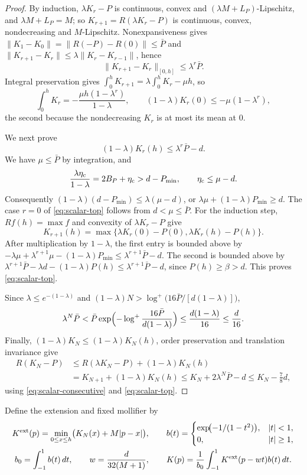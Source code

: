 \begin{proof}
By induction, $\lambda K_r-P$ is continuous, convex and $(\lambda M+L_P)$-Lipschitz, and $\lambda M+L_P=M$; so
$K_{r+1}=R(\lambda K_r-P)$ is continuous, convex, nondecreasing and $M$-Lipschitz. Nonexpansiveness gives
$\|K_1-K_0\|=\|R(-P)-R(0)\|\le\bar P$ and $\|K_{r+1}-K_r\|\le\lambda\|K_r-K_{r-1}\|$, hence
\begin{equation}\label{eq:scalar-consecutive}
 \|K_{r+1}-K_r\|_{[0,h]}\le\lambda^r\bar P.
\end{equation}
Integral preservation gives $\int_0^hK_{r+1}=\lambda\int_0^hK_r-\mu h$, so
\[
 \int_0^hK_r=-\frac{\mu h(1-\lambda^r)}{1-\lambda},\qquad
 (1-\lambda)K_r(0)\le-\mu(1-\lambda^r),
\]
the second because the nondecreasing $K_r$ is at most its mean at $0$.

We next prove
\begin{equation}\label{eq:scalar-top}
 (1-\lambda)K_r(h)\le\lambda^r\bar P-d.
\end{equation}
We have $\mu\le\bar P$ by integration, and
\[
 \frac{\lambda\eta_{\rm c}}{1-\lambda}=2B_P+\eta_{\rm c}>d-P_{\min},\qquad
 \eta_{\rm c}\le\mu-d.
\]
Consequently
$(1-\lambda)(d-P_{\min})\le\lambda(\mu-d)$, or
$\lambda\mu+(1-\lambda)P_{\min}\ge d$.
The case $r=0$ of \eqref{eq:scalar-top} follows from $d<\mu\le\bar P$.
For the induction step, $Rf(h)=\max f$ and convexity of $\lambda K_r-P$ give
\[
 K_{r+1}(h)=\max\{\lambda K_r(0)-P(0),\lambda K_r(h)-P(h)\}.
\]
After multiplication by $1-\lambda$, the first entry is bounded above by
$-\lambda\mu+\lambda^{r+1}\mu-(1-\lambda)P_{\min}\le\lambda^{r+1}\bar P-d$.
The second is bounded above by
$\lambda^{r+1}\bar P-\lambda d-(1-\lambda)P(h)\le\lambda^{r+1}\bar P-d$, since $P(h)\ge\beta>d$.
This proves \eqref{eq:scalar-top}.

Since $\lambda\le e^{-(1-\lambda)}$ and $(1-\lambda)N>\log^+\bigl(16\bar P/[d(1-\lambda)]\bigr)$,
\[
 \lambda^N\bar P<\bar P\exp\Bigl(-\log^+\frac{16\bar P}{d(1-\lambda)}\Bigr)\le\frac{d(1-\lambda)}{16}\le\frac d{16}.
\]
Finally, $(1-\lambda)K_N\le(1-\lambda)K_N(h)$, order preservation and translation invariance give
\begin{align*}
 R(K_N-P)&\le R(\lambda K_N-P)+(1-\lambda)K_N(h)\\
 &=K_{N+1}+(1-\lambda)K_N(h)
 \le K_N+2\lambda^N\bar P-d\le K_N-\frac78d,
\end{align*}
using \eqref{eq:scalar-consecutive} and \eqref{eq:scalar-top}.
\end{proof}

Define the extension and fixed mollifier by
\begin{gather}\label{eq:scalar-mollifier}
 K^{\rm ext}(p)=\min_{0\le x\le h}\bigl(K_N(x)+M|p-x|\bigr),\qquad
 b(t)=\begin{cases}\exp\!\bigl(-1/(1-t^2)\bigr),&|t|<1,\\0,&|t|\ge1,\end{cases}\\
 b_0=\int_{-1}^1b(t)\,dt,\qquad w=\frac{d}{32(M+1)},\qquad
 K(p)=\frac1{b_0}\int_{-1}^1K^{\rm ext}(p-wt)b(t)\,dt.\notag
\end{gather}

